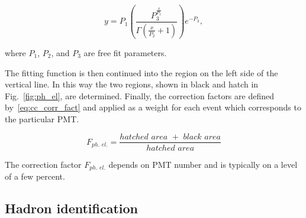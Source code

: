 \documentclass[prc,twocolumn,superscriptaddress,showpacs,amssymb,amsmath,amsfonts,linenumbers,aps]{revtex4-1}
\begin{document}
\begin{equation}
y = P_{1}\left(\frac{P_{3}^{\frac{x}{P_{2}}}}{\Gamma\left(\frac{x}{P_{2}}+1\right)}
\right)e^{-P_{3}},
\label{eq:cc_Poisson}
\end{equation}

where $P_{1}$, $P_{2}$, and $P_{3}$ are free fit parameters.

The fitting function is then continued into the region on the left side of the vertical line. In this way the two regions, shown in black and hatch in Fig.~\ref{fig:ph_el}, are determined. Finally, the correction factors are defined by~\eqref{eq:cc_corr_fact} and applied as a weight for each event which corresponds to the particular PMT. 

\begin{equation}
F_{ph.\,\, el.} = \frac{{hatched\,\,  area} {\,\,+\,\,} {black\,\,  area}}{{hatched\,\,  area}}
\label{eq:cc_corr_fact}
\end{equation}

The correction factor $F_{ph.\,\, el.}$ depends on PMT number and is typically on a level of a few percent.







 







\subsection{Hadron identification}
\end{document}
